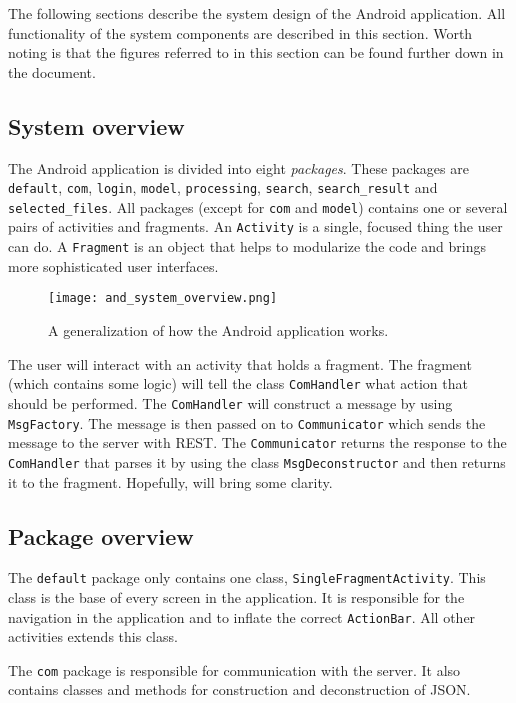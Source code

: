 The following sections describe the system design of the Android application. All functionality of the system components are described in this section. Worth noting is that the figures referred to in this section can be found further down in the document.

\subsection{System overview}
	The Android application is divided into eight \emph{packages}. These packages are \verb!default!, \verb!com!, \verb!login!, \verb!model!, \verb!processing!, \verb!search!, \verb!search_result! and \verb!selected_files!.
	All packages (except for \verb!com! and \verb!model!) contains one or several pairs of activities and fragments. An \verb!Activity! is a single, focused thing the user can do. A \verb!Fragment! is an object that helps to modularize the code and brings more sophisticated user 	interfaces.

	\begin{figure}[h]
		\centering
		\texttt{[image: and\_system\_overview.png]}
		\caption{\label{fig:and_system_overview}A generalization of how the Android application works.}
	\end{figure}

	The user will interact with an activity that holds a fragment. The fragment (which contains some logic) will tell the class \verb!ComHandler! what action that should be performed. The \verb!ComHandler! will construct a message by using \verb!MsgFactory!. The message is then passed on to \verb!Communicator! which sends the message to the server with REST. The \verb!Communicator! returns the response to the \verb!ComHandler! that parses it by using the class \verb!MsgDeconstructor! and then returns it to the fragment. Hopefully,  will bring some clarity.
	
\subsection{Package overview}
	The \verb!default! package only contains one class, \verb!SingleFragmentActivity!. This class is the base of every screen in the application. It is responsible for the navigation in the application and to inflate the correct \verb!ActionBar!. All other activities extends this 	class.

	The \verb!com! package is responsible for communication with the server. It also contains classes and methods for construction and deconstruction of JSON.

